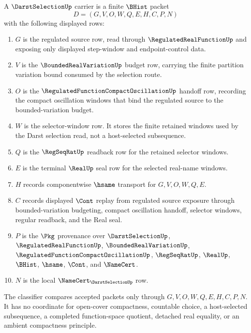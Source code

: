 \begin{definition}
\label{def:darst-selection-carrier}
A $\DarstSelectionUp$ carrier is a finite $\BHist$ packet
$$
D=(G,V,O,W,Q,E,H,C,P,N)
$$
with the following displayed rows:
\begin{enumerate}
\item $G$ is the regulated source row, read through $\RegulatedRealFunctionUp$ and exposing only displayed step-window and endpoint-control data.
\item $V$ is the $\BoundedRealVariationUp$ budget row, carrying the finite partition variation bound consumed by the selection route.
\item $O$ is the $\RegulatedFunctionCompactOscillationUp$ handoff row, recording the compact oscillation windows that bind the regulated source to the bounded-variation budget.
\item $W$ is the selector-window row. It stores the finite retained windows used by the Darst selection read, not a host-selected subsequence.
\item $Q$ is the $\RegSeqRatUp$ readback row for the retained selector windows.
\item $E$ is the terminal $\RealUp$ seal row for the selected real-name windows.
\item $H$ records componentwise $\hsame$ transport for $G,V,O,W,Q,E$.
\item $C$ records displayed $\Cont$ replay from regulated source exposure through bounded-variation budgeting, compact oscillation handoff, selector windows, regular readback, and the Real seal.
\item $P$ is the $\Pkg$ provenance over $\DarstSelectionUp$, $\RegulatedRealFunctionUp$, $\BoundedRealVariationUp$, $\RegulatedFunctionCompactOscillationUp$, $\RegSeqRatUp$, $\RealUp$, $\BHist$, $\hsame$, $\Cont$, and $\NameCert$.
\item $N$ is the local $\NameCert_{\DarstSelectionUp}$ row.
\end{enumerate}
The classifier compares accepted packets only through $G,V,O,W,Q,E,H,C,P,N$. It has no coordinate for open-cover compactness, countable choice, a host-selected subsequence, a completed function-space quotient, detached real equality, or an ambient compactness principle.
\end{definition}

